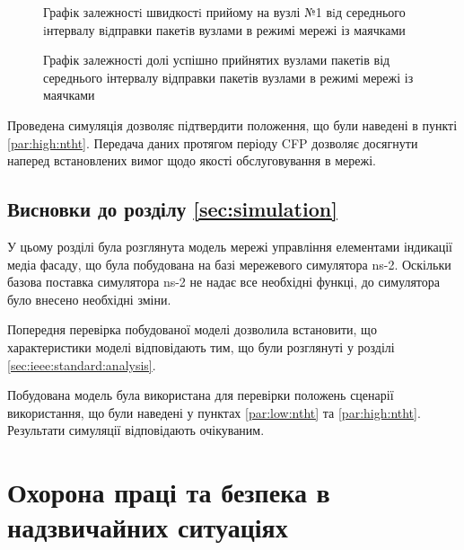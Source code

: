 \documentclass[a4paper,ukrainian,utf8,nocolumnsxix,floatsection,equationsection]{eskdtext}
\newcommand{\longcaption}[1]{\captionsetup{style=figureLongCaption}\caption{#1}}
\begin{document}
\begin{figure}[bp]
	\centering
	\longcaption{\label{fig:result_test_backtraf_beac_brd_tp1}Графiк залежностi швидкостi прийому на вузлі №1 вiд середнього iнтервалу вiдправки пакетiв вузлами в режимі мережі із маячками}
\end{figure}

\begin{figure}[htbp]
	\centering
	\longcaption{\label{fig:result_test_backtraf_beac_brd_deliv}Графік залежності долі успішно прийнятих вузлами пакетів від середнього інтервалу відправки пакетів вузлами в режимі мережі із маячками}
\end{figure}


Проведена симуляція дозволяє підтвердити положення, що були наведені в пункті \ref{par:high:ntht}. Передача даних протягом періоду CFP дозволяє досягнути наперед встановлених вимог щодо якості обслуговування в мережі. 

\subsection{Висновки до розділу \ref{sec:simulation}}

У цьому розділі була розглянута модель мережі управління елементами індикації медіа фасаду, що була побудована на базі мережевого симулятора ns-2. Оскільки базова поставка симулятора ns-2 не надає все необхідні функці, до симулятора було внесено необхідні зміни.

Попередня перевірка побудованої моделі дозволила встановити, що характеристики моделі відповідають тим, що були розглянуті у розділі \ref{sec:ieee:standard:analysis}. 

Побудована модель була використана для перевірки положень сценарії використання, що були наведені у пунктах \ref{par:low:ntht} та \ref{par:high:ntht}. Результати симуляції відповідають очікуваним. 


\section{Охорона праці та безпека в надзвичайних ситуаціях}
\label{sec:work_safety}
\end{document}

